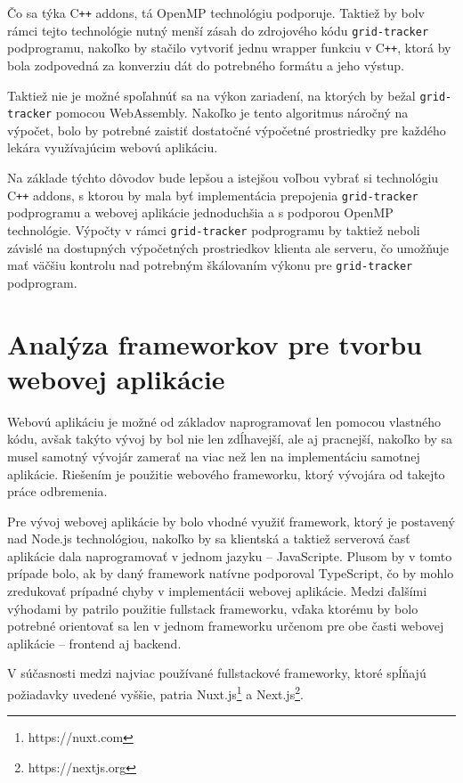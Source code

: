 Čo sa týka C\texttt{++} addons, tá OpenMP technológiu podporuje. Taktiež by bol\newline v rámci tejto technológie nutný menší zásah do zdrojového kódu \texttt{grid-tracker} podprogramu, nakoľko by stačilo vytvoriť jednu wrapper funkciu v C\texttt{++}, ktorá by bola zodpovedná za konverziu dát do potrebného formátu a jeho výstup.

\clearpage

Taktiež nie je možné spoľahnúť sa na výkon zariadení, na ktorých by bežal \texttt{grid-tracker} pomocou WebAssembly. Nakoľko je tento algoritmus náročný na výpočet, bolo by potrebné zaistiť dostatočné výpočetné prostriedky pre každého lekára využívajúcim webovú aplikáciu.

Na základe týchto dôvodov bude lepšou a istejšou voľbou vybrať si technológiu C\texttt{++} addons, s ktorou by mala byť implementácia prepojenia \texttt{grid-tracker} podprogramu a webovej aplikácie jednoduchšia a s podporou OpenMP technológie. Výpočty v rámci \texttt{grid-tracker} podprogramu by taktiež neboli závislé na dostupných výpočetných prostriedkov klienta ale serveru, čo umožňuje mať väčšiu kontrolu nad potrebným škálovaním výkonu pre \texttt{grid-tracker} podprogram.

\section {Analýza frameworkov pre tvorbu webovej aplikácie}
Webovú aplikáciu je možné od základov naprogramovať len pomocou vlastného kódu, avšak takýto vývoj by bol nie len zdĺhavejší, ale aj pracnejší, nakoľko by sa musel samotný vývojár zamerať na viac než len na implementáciu samotnej aplikácie. Riešením je použitie webového frameworku, ktorý vývojára od takejto práce odbremenia. 

Pre vývoj webovej aplikácie by bolo vhodné využiť framework, ktorý je postavený nad Node.js technológiou, nakoľko by sa klientská a taktiež serverová časť aplikácie dala naprogramovať v jednom jazyku -- JavaScripte. Plusom by v tomto prípade bolo, ak by daný framework natívne podporoval TypeScript, čo by mohlo zredukovať prípadné chyby v implementácii webovej aplikácie.
Medzi ďalšími výhodami by patrilo použitie fullstack frameworku, vďaka ktorému by bolo potrebné orientovať sa len v jednom frameworku určenom pre obe časti webovej aplikácie -- frontend aj backend.

V súčasnosti medzi najviac používané fullstackové frameworky, ktoré \newline spĺňajú požiadavky uvedené vyššie, patria Nuxt.js\footnote{https://nuxt.com} a Next.js\footnote{https://nextjs.org}.

